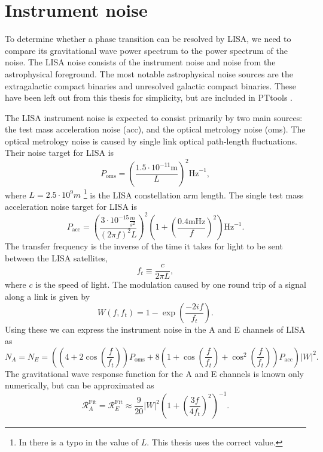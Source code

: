 \section{Instrument noise}
\label{noise}
To determine whether a phase transition can be resolved by LISA,
we need to compare its gravitational wave power spectrum to the power spectrum of the noise.
The LISA noise consists of the instrument noise and noise from the astrophysical foreground.
The most notable astrophysical noise sources are the extragalactic compact binaries and unresolved galactic compact binaries.
These have been left out from this thesis for simplicity, but are included in PTtools \cite{pttools}.
\cite{gowling_lisa_2021}

The LISA instrument noise is expected to consist primarily by two main sources: the test mass acceleration noise (acc), and the optical metrology noise (oms).
The optical metrology noise is caused by single link optical path-length fluctuations.
Their noise target for LISA is
\cites[eq. 3.2]{gowling_lisa_2021}[eq. 54]{smith_lisa_2019}
\begin{equation}
P_\text{oms} = \left( \frac{1.5 \cdot 10^{-11} \text{m}}{L} \right)^2 \text{Hz}^{-1},
\end{equation}
where $L = 2.5 \cdot 10^9 m$
\footnote{In \cite[p. 12]{gowling_lisa_2021} there is a typo in the value of $L$. This thesis uses the correct value.}
is the LISA constellation arm length.
The single test mass acceleration noise target for LISA is
\cites[eq. 3.3]{gowling_lisa_2021}[eq. 52-53]{smith_lisa_2019}
\begin{equation}
P_\text{acc} = \left( \frac{3 \cdot 10^{-15} \frac{m}{s^2}}{(2\pi f)^2 L} \right)^2 \left( 1 + \left( \frac{0.4 \text{mHz}}{f} \right)^2 \right) \text{Hz}^{-1}.
\end{equation}
The transfer frequency is the inverse of the time it takes for light to be sent between the LISA satellites,
\begin{equation}
f_t \equiv \frac{c}{2 \pi L},
\end{equation}
where $c$ is the speed of light.
The modulation caused by one round trip of a signal along a link is given by
\cite[p. 12]{gowling_lisa_2021}
\begin{equation}
W(f,f_t) = 1 - \exp \left( \frac{-2if}{f_t} \right).
\end{equation}
Using these we can express the instrument noise in the A and E channels of LISA as
\cites[eq. 3.4]{gowling_lisa_2021}[eq. 57]{smith_lisa_2019}
\begin{equation}
N_A = N_E = \left(
\left(4 + 2 \cos \left( \frac{f}{f_t} \right) \right) P_\text{oms} +
8 \left( 1 + \cos \left( \frac{f}{f_t} \right) + \cos^2 \left( \frac{f}{f_t} \right) \right) P_\text{acc}
\right) |W|^2.
\end{equation}
The gravitational wave response function for the A and E channels is known only numerically, but can be approximated as
\cites[eq. 3.6]{gowling_lisa_2021}[eq. 32]{smith_lisa_2019}
\begin{equation}
\mathcal{R}_A^\text{Fit} = \mathcal{R}_E^\text{Fit} \approx \frac{9}{20} |W|^2 \left( 1 + \left( \frac{3f}{4f_t} \right)^2 \right)^{-1}.
\end{equation}


